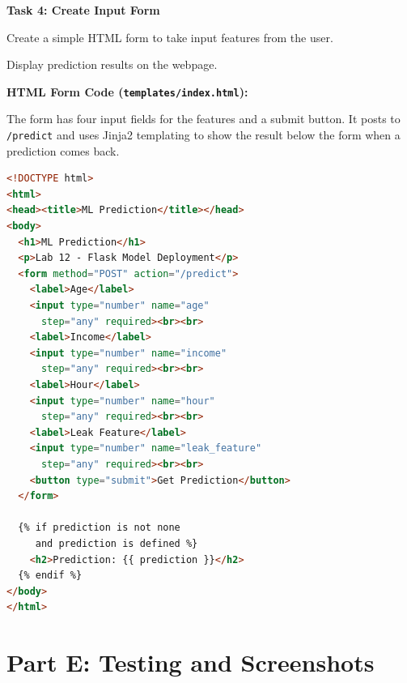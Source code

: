\documentclass[12pt,a4paper]{article}
\begin{document}
\begin{tcolorbox}
\textbf{Task 4: Create Input Form}

Create a simple HTML form to take input features from the user.

Display prediction results on the webpage.

\textbf{HTML Form Code (\texttt{templates/index.html}):}

The form has four input fields for the features and a submit button. It posts to \texttt{/predict} and uses Jinja2 templating to show the result below the form when a prediction comes back.

\begin{lstlisting}[language=HTML]
<!DOCTYPE html>
<html>
<head><title>ML Prediction</title></head>
<body>
  <h1>ML Prediction</h1>
  <p>Lab 12 - Flask Model Deployment</p>
  <form method="POST" action="/predict">
    <label>Age</label>
    <input type="number" name="age"
      step="any" required><br><br>
    <label>Income</label>
    <input type="number" name="income"
      step="any" required><br><br>
    <label>Hour</label>
    <input type="number" name="hour"
      step="any" required><br><br>
    <label>Leak Feature</label>
    <input type="number" name="leak_feature"
      step="any" required><br><br>
    <button type="submit">Get Prediction</button>
  </form>

  {% if prediction is not none
     and prediction is defined %}
    <h2>Prediction: {{ prediction }}</h2>
  {% endif %}
</body>
</html>
\end{lstlisting}

\end{tcolorbox}

\vspace{24pt}


\section*{Part E: Testing and Screenshots}
\end{document}
